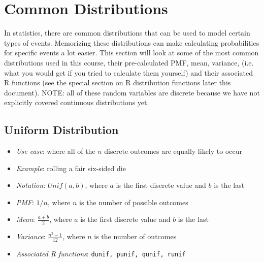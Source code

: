\documentclass[12pt]{article}
\begin{document}
\section{Common Distributions}

In statistics, there are common distributions that can be used to model certain
types of events. Memorizing these distributions can make calculating
probabilities for specific events a lot easier. This section will look at some
of the most common distributions used in this course, their pre-calculated PMF,
mean, variance, (i.e. what you would get if you tried to calculate them
yourself) and their associated R functions (see the special section on R
distribution functions later this document). NOTE: all of these random
variables are discrete because we have not explicitly covered continuous
distributions yet.

\subsection{Uniform Distribution}
\begin{itemize}
	\item \textit{Use case}: where all of the $n$ discrete outcomes are equally likely to occur
	\item \textit{Example}: rolling a fair six-sided die
	\item \textit{Notation}: $Unif(a, b)$, where $a$ is the first discrete value and $b$ is the last
	\item \textit{PMF}: $1 / n$, where $n$ is the number of possible outcomes
	\item \textit{Mean}: $\frac{a + b}{2}$, where $a$ is the first discrete value and $b$ is the last
	\item \textit{Variance}: $\frac{n^2 - 1}{12}$, where $n$ is the number of outcomes
	\item \textit{Associated R functions}: \verb|dunif, punif, qunif, runif|
\end{itemize}
\end{document}
